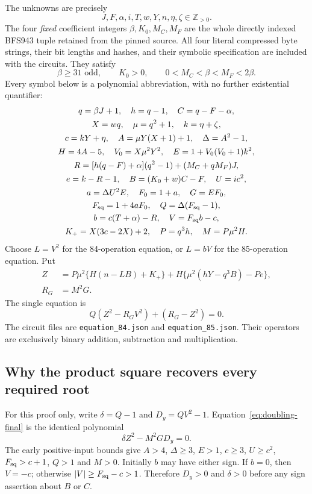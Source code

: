 The unknowns are precisely
\[
 J,F,\alpha,i,T,w,Y,n,\eta,\zeta\in\mathbb Z_{>0}.
\]
The four \emph{fixed} coefficient integers $\beta,K_0,M_C,M_F$ are
the whole directly indexed BFS943 tuple retained from the pinned source.
All four literal compressed byte strings, their bit lengths and hashes,
and their symbolic specification are included with the circuits.  They
satisfy
\[
 \beta\ge31\text{ odd},\qquad K_0>0,\qquad
 0<M_C<\beta<M_F<2\beta.
\]
Every symbol below is a polynomial abbreviation, with no further
existential quantifier:
\begin{gather*}
 q=\beta J+1,\quad h=q-1,\quad C=q-F-\alpha,\\
 X=wq,\quad \mu=q^2+1,\quad k=\eta+\zeta,\\
 c=kY+\eta,\quad A=\mu Y(X+1)+1,\quad \Delta=A^2-1,\\
 H=4A-5,\quad V_0=X\mu^2Y^2,\quad E=1+V_0(V_0+1)k^2,\\
 R=[h(q-F)+\alpha](q^2-1)+(M_C+qM_F)J,\\
 e=k-R-1,\quad B=(K_0+w)C-F,\quad U=ic^2,\\
 a=\Delta U^2E,\quad F_0=1+a,\quad G=EF_0,\\
 F_{\rm sq}=1+4aF_0,\quad Q=\Delta(F_{\rm sq}-1),\\
 b=c(T+\alpha)-R,\quad V=F_{\rm sq}b-c,\\
 K_+=X(3c-2X)+2,\quad P=q^3h,\quad M=P\mu^2H.
\end{gather*}
Choose $L=V^2$ for the 84-operation equation, or $L=bV$ for the
85-operation equation.  Put
\begin{align*}
 Z&=P\mu^2\{H(n-LB)+K_+\}
       +H\{\mu^2(hY-q^3B)-Pe\},\\
 R_G&=M^2G.
\end{align*}
The single equation is
\begin{equation}
 \boxed{Q(Z^2-R_GV^2)+(R_G-Z^2)=0.}
 \label{eq:doubling-final}
\end{equation}
The circuit files are \texttt{equation\_84.json} and
\texttt{equation\_85.json}.  Their operators are exclusively binary
addition, subtraction and multiplication.

\subsection{Why the product square recovers every required root}

For this proof only, write $\delta=Q-1$ and $D_y=QV^2-1$.
Equation~\eqref{eq:doubling-final} is the identical polynomial
\begin{equation}
 \delta Z^2-M^2GD_y=0.
 \label{eq:doubling-product}
\end{equation}
The early positive-input bounds give $A>4$, $\Delta\ge3$, $E>1$,
$c\ge3$, $U\ge c^2$, $F_{\rm sq}>c+1$, $Q>1$ and $M>0$.
Initially $b$ may have either sign.  If $b=0$, then $V=-c$;
otherwise $|V|\ge F_{\rm sq}-c>1$.  Therefore $D_y>0$ and
$\delta>0$ before any sign assertion about $B$ or $C$.

